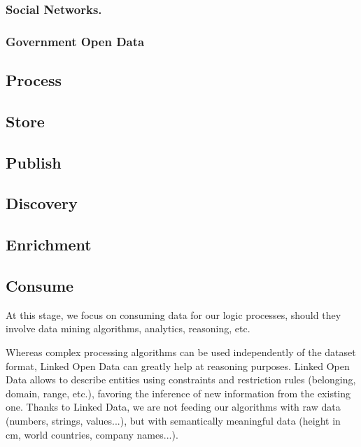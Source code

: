 \subsubsection{Social Networks.}



\subsubsection{Government Open Data}

\subsection{Process}
\label{subsec:process}

\subsection{Store}

\subsection{Publish}

\subsection{Discovery}
\label{subsec:discovery}

\subsection{Enrichment}

\subsection{Consume}


At this stage, we focus on consuming data for our logic processes, should they involve data mining algorithms, analytics, reasoning, etc.

Whereas complex processing algorithms can be used independently of the dataset format, Linked Open Data can greatly help at reasoning purposes. Linked Open Data allows to describe entities using constraints and restriction rules (belonging, domain, range, etc.), favoring the inference of new information from the existing one. Thanks to Linked Data, we are not feeding our algorithms with raw data (numbers, strings, values...), but with semantically meaningful data (height in cm, world countries, company names...).

